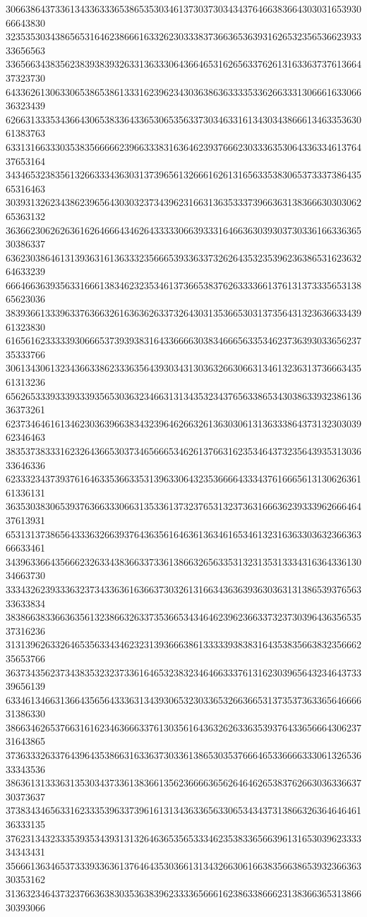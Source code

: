 30663864373361343363336538653530346137303730343437646638366430303165393066643830
32353530343865653164623866616332623033383736636536393162653235653662393333656563
33656634383562383938393263313633306436646531626563376261316336373761366437323730
64336261306330653865386133316239623430363863633335336266333130666163306636323439
62663133353436643065383364336530653563373034633161343034386661346335363061383763
63313166333035383566666239663338316364623937666230333635306433633461376437653164
34346532383561326633343630313739656132666162613165633538306537333738643565316463
30393132623438623965643030323734396231663136353337396636313836663030306265363132
36366230626263616264666434626433333066393331646636303930373033616633636530386337
63623038646131393631613633323566653933633732626435323539623638653162363264633239
66646636393563316661383462323534613736653837626333366137613137333565313865623036
38393661333963376366326163636263373264303135366530313735643132363663343961323830
61656162333339306665373939383164336666303834666563353462373639303365623735333766
30613430613234366338623336356439303431303632663066313461323631373666343561313236
65626533393339333935653036323466313134353234376563386534303863393238613636373261
62373464616134623036396638343239646266326136303061313633386437313230303962346463
38353738333162326436653037346566653462613766316235346437323564393531303633646336
62333234373937616463353663353139633064323536666433343761666561313062636161336131
36353038306539376366333066313533613732376531323736316663623933396266646437613931
65313137386564333632663937643635616463613634616534613231636330363236636366633461
34396336643566623263343836633733613866326563353132313531333431636433613034663730
33343262393336323734336361636637303261316634363639363036313138653937656333633834
38386638336636356132386632633735366534346462396236633732373039643635653537316236
31313962633264653563343462323139366638613333393838316435383566383235666235653766
36373435623734383532323733616465323832346466333761316230396564323464373339656139
63346134663136643565643336313439306532303365326636653137353736336564666631386330
38663462653766316162346366633761303561643632626336353937643365666430623731643865
37363332633764396435386631633637303361386530353766646533666633306132653633343536
38636131333631353034373361383661356236666365626464626538376266303633663730373637
37383434656331623335396337396161313436336563306534343731386632636464646136333135
37623134323335393534393131326463653565333462353833656639613165303962333334343431
35666136346537333933636137646435303661313432663061663835663865393236636330353162
31363234643732376636383035363839623333656661623863386662313836636531386630393066

